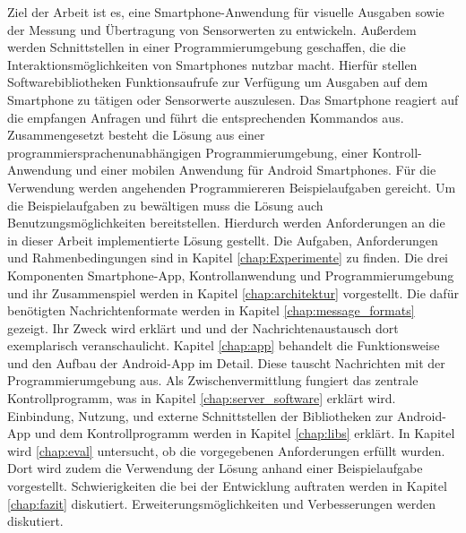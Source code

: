 \documentclass[11pt,a4paper]{report}
\begin{document}
Ziel der Arbeit ist es, eine Smartphone-Anwendung für visuelle Ausgaben sowie der Messung und Übertragung von Sensorwerten zu entwickeln.
Außerdem werden Schnittstellen in einer Programmierumgebung geschaffen, die die Interaktionsmöglichkeiten von Smartphones nutzbar macht.
Hierfür stellen Softwarebibliotheken Funktionsaufrufe zur Verfügung um Ausgaben auf dem Smartphone zu tätigen oder Sensorwerte auszulesen.
Das Smartphone reagiert auf die empfangen Anfragen und führt die entsprechenden Kommandos aus.
Zusammengesetzt besteht die Lösung aus einer programmiersprachenunabhängigen Programmierumgebung, einer Kontroll-Anwendung und einer mobilen Anwendung für Android Smartphones.
Für die Verwendung werden angehenden Programmiereren Beispielaufgaben gereicht.
Um die Beispielaufgaben zu bewältigen muss die Lösung auch Benutzungsmöglichkeiten bereitstellen.
Hierdurch werden Anforderungen an die in dieser Arbeit implementierte Lösung gestellt.
Die Aufgaben, Anforderungen und Rahmenbedingungen sind in Kapitel \ref{chap:Experimente} zu finden.
Die drei Komponenten Smartphone-App, Kontrollanwendung und Programmierumgebung und ihr Zusammenspiel werden
in Kapitel \ref{chap:architektur} vorgestellt.
Die dafür benötigten Nachrichtenformate werden in Kapitel \ref{chap:message_formats} gezeigt.
Ihr Zweck wird erklärt und und der Nachrichtenaustausch dort exemplarisch veranschaulicht.
Kapitel \ref{chap:app} behandelt die Funktionsweise und den Aufbau der Android-App im Detail.
Diese tauscht Nachrichten mit der Programmierumgebung aus.
Als Zwischenvermittlung fungiert das zentrale Kontrollprogramm, was in Kapitel \ref{chap:server_software} erklärt wird.
Einbindung, Nutzung, und externe Schnittstellen der Bibliotheken zur Android-App und dem Kontrollprogramm werden in Kapitel \ref{chap:libs} erklärt.
In Kapitel wird \ref{chap:eval} untersucht, ob die vorgegebenen Anforderungen erfüllt wurden.
Dort wird zudem die Verwendung der Lösung anhand einer Beispielaufgabe vorgestellt.
Schwierigkeiten die bei der Entwicklung auftraten werden in Kapitel \ref{chap:fazit} diskutiert.
Erweiterungsmöglichkeiten und Verbesserungen werden diskutiert.
\end{document}
